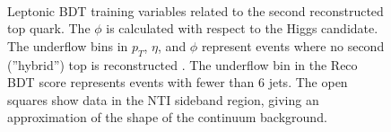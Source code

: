 \begin{figure}[htbp]
  \centering
	 \\
  \caption{Leptonic BDT training variables related to the second reconstructed top quark. The $\phi$ is calculated with respect to the Higgs candidate. The underflow bins in $p_{T}$, $\eta$, and $\phi$ represent events where no second (''hybrid'') top is reconstructed . The underflow bin in the Reco BDT score represents events with fewer than 6 jets. The open squares show data in the NTI sideband region, giving an approximation of the shape of the continuum background. }
  \label{fig:lepvbls3}
\end{figure}


